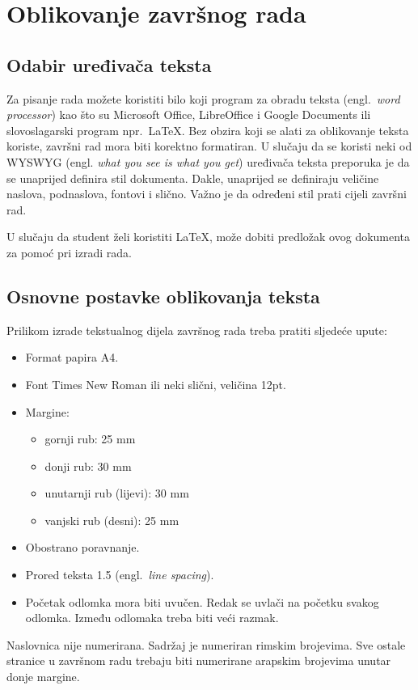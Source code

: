 \section{Oblikovanje završnog rada}

\subsection{Odabir uređivača teksta}

Za pisanje rada možete koristiti bilo koji program za obradu teksta (engl.~\textit{word processor}) kao što su Microsoft Office, LibreOffice i Google Documents ili slovoslagarski program npr.~\LaTeX. Bez obzira koji se alati za oblikovanje teksta koriste, završni rad mora biti korektno formatiran. U slučaju da se koristi neki od WYSWYG (engl. \textit{what you see is what you get}) uređivača teksta preporuka je da se unaprijed definira 
stil dokumenta. Dakle, unaprijed se definiraju veličine naslova, podnaslova, fontovi i slično. Važno je da određeni stil prati cijeli završni rad. 


U slučaju da student želi koristiti \LaTeX, može dobiti predložak ovog dokumenta za pomoć pri izradi rada.

\subsection{Osnovne postavke oblikovanja teksta}
Prilikom izrade tekstualnog dijela završnog rada treba pratiti sljedeće upute:
\begin{itemize}
 \item Format papira A4.
 \item Font Times New Roman ili neki slični, veličina 12pt.
 \item Margine:
 \begin{itemize}
  \item gornji rub: 25 mm
  \item donji rub: 30 mm
  \item unutarnji rub (lijevi): 30 mm
  \item vanjski rub (desni): 25 mm
 \end{itemize}
 \item Obostrano poravnanje.
 \item Prored teksta 1.5 (engl.~\textit{line spacing}).
 \item Početak odlomka mora biti uvučen. Redak se uvlači na početku svakog odlomka. Između odlomaka treba biti veći razmak.
 
 \end{itemize}
Naslovnica nije numerirana. Sadržaj je numeriran rimskim brojevima. Sve ostale stranice u završnom radu trebaju biti numerirane arapskim brojevima unutar donje margine. 

